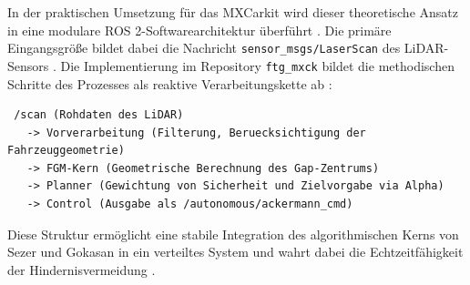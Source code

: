 In der praktischen Umsetzung für das MXCarkit wird dieser theoretische Ansatz in eine modulare ROS 2-Softwarearchitektur überführt \cite{mxck_repo}. Die primäre Eingangsgröße bildet dabei die Nachricht \texttt{sensor\_msgs/LaserScan} des LiDAR-Sensors \cite{mxck_repo}. Die Implementierung im Repository \texttt{ftg\_mxck} bildet die methodischen Schritte des Prozesses als reaktive Verarbeitungskette ab \cite{mxck_repo}:

\begin{lstlisting}
 /scan (Rohdaten des LiDAR)
   -> Vorverarbeitung (Filterung, Beruecksichtigung der Fahrzeuggeometrie)
   -> FGM-Kern (Geometrische Berechnung des Gap-Zentrums)
   -> Planner (Gewichtung von Sicherheit und Zielvorgabe via Alpha)
   -> Control (Ausgabe als /autonomous/ackermann_cmd)
\end{lstlisting}

Diese Struktur ermöglicht eine stabile Integration des algorithmischen Kerns von Sezer und Gokasan in ein verteiltes System und wahrt dabei die Echtzeitfähigkeit der Hindernisvermeidung \cite{mxck_repo}.

